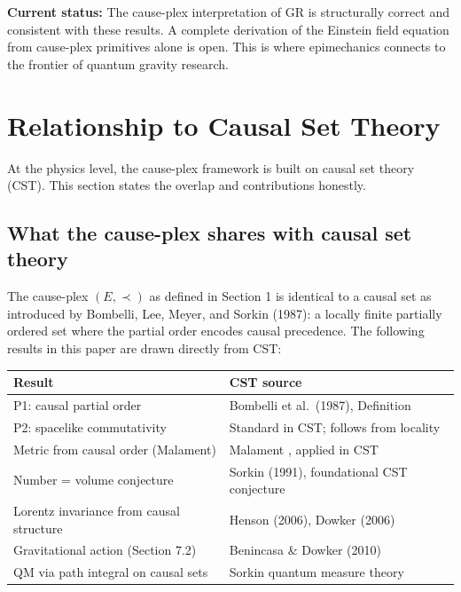 \documentclass[11pt]{article}
\theoremstyle{definition}
\theoremstyle{remark}
\begin{document}
\textbf{Current status:} The cause-plex interpretation of GR is
structurally correct and consistent with these results. A complete
derivation of the Einstein field equation from cause-plex primitives
alone is open. This is where epimechanics connects to the frontier of
quantum gravity research.

\medskip

\section{Relationship to Causal Set
Theory}\label{relationship-to-causal-set-theory}

At the physics level, the cause-plex framework is built on causal set
theory (CST). This section states the overlap and contributions
honestly.

\subsection{What the cause-plex shares with causal set
theory}\label{what-the-cause-plex-shares-with-causal-set-theory}

The cause-plex \((E, \prec)\) as defined in Section 1 is identical to a
causal set as introduced by Bombelli, Lee, Meyer, and Sorkin (1987): a
locally finite partially ordered set where the partial order encodes
causal precedence. The following results in this paper are drawn
directly from CST:

{\def\LTcaptype{none} %
\begin{longtable}[]{@{}
  >{\raggedright\arraybackslash}p{}
  >{\raggedright\arraybackslash}p{}@{}}
\toprule\noalign{}
\begin{minipage}[b]{\linewidth}\raggedright
Result
\end{minipage} & \begin{minipage}[b]{\linewidth}\raggedright
CST source
\end{minipage} \\
\midrule\noalign{}
\endhead
\bottomrule\noalign{}
\endlastfoot
P1: causal partial order & Bombelli et al.~(1987), Definition \\
P2: spacelike commutativity & Standard in CST; follows from locality \\
Metric from causal order (Malament) & Malament \cite{Malament1977},
applied in CST \\
Number = volume conjecture & Sorkin (1991), foundational CST
conjecture \\
Lorentz invariance from causal structure & Henson (2006), Dowker
(2006) \\
Gravitational action (Section 7.2) & Benincasa \& Dowker (2010) \\
QM via path integral on causal sets & Sorkin \cite{Sorkin1994} quantum
measure theory \\
\end{longtable}
}
\end{document}
